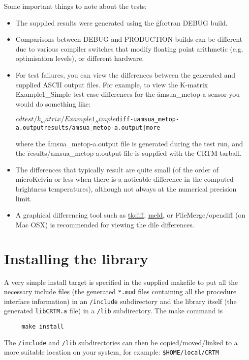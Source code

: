 Some important things to note about the tests:
\begin{itemize}
  \item The supplied results were generated using the \f{gfortran} DEBUG build.
  \item Comparisons between DEBUG and PRODUCTION builds can be different due to various compiler switches that modify floating point arithmetic (e.g. optimisation levels), or different hardware.
  \item For test failures, you can view the differences between the generated and supplied ASCII output files. For example, to view the K-matrix \f{Example1\_Simple} test case differences for the \f{amsua\_metop-a} sensor you would do something like:
\begin{alltt}
  $ cd test/k_matrix/Example1_Simple
  $ diff -u amsua_metop-a.output results/amsua_metop-a.output | more\end{alltt}

where the \f{amsua\_metop-a.output} file is generated during the test run, and the \f{results/amsua\_metop-a.output} file is supplied with the CRTM tarball.
  \item The differences that typically result are quite small (of the order of microKelvin or less when there is a noticable difference in the computed brightness temperatures), although not always at the numerical precision limit.
  \item A graphical differencing tool such as \href{http://tkdiff.sourceforge.net/}{tkdiff}, \href{http://meldmerge.org/}{meld}, or FileMerge/opendiff (on Mac OSX) is recommended for viewing the dile differences.
\end{itemize}


\section{Installing the library}
A very simple install target is specified in the supplied makefile to put all the necessary include files (the generated \texttt{*.mod} files containing all the procedure interface information) in an \texttt{/include} subdirectory and the library itself (the generated \texttt{libCRTM.a} file) in a \texttt{/lib} subdirectory. The make command is
\begin{verbatim}     make install\end{verbatim}
The \texttt{/include} and \texttt{/lib} subdirectories can then be copied/moved/linked to a more suitable location on your system, for example: \texttt{\$HOME/local/CRTM}


